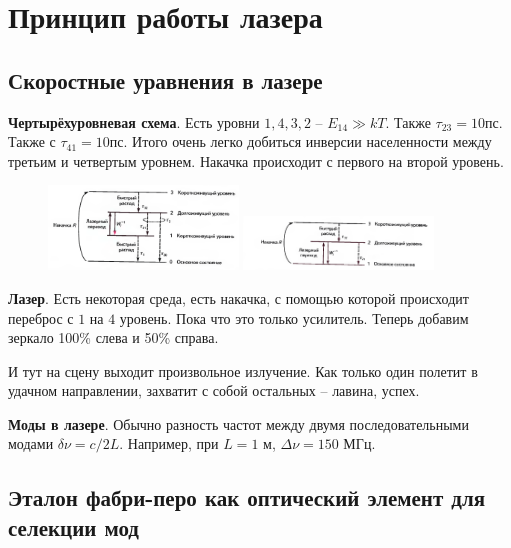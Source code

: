 \section{Принцип работы лазера}



\subsection{Скоростные уравнения в лазере}



\textbf{Чертырёхуровневая схема}.
Есть уровни $1,4,3,2$ -- $E_{14} \gg k T$. Также $\tau_{23} = 10$пс. Также с $\tau_{41} = 10$пс. Итого очень легко добиться инверсии населенности между третьим и четвертым уровнем. Накачка происходит с первого на второй уровень. 




\begin{figure}[hb]
    \centering
    \includegraphics[width=0.45\textwidth]{figures/012.png}
    \includegraphics[width=0.45\textwidth]{figures/013.png}
\end{figure}



\textbf{Лазер}.
Есть некоторая среда, есть накачка, с помощью которой происходит переброс с $1$ на $4$ уровень. Пока что это только усилитель. Теперь добавим зеркало 100\% слева и 50\% справа. 

И тут на сцену выходит произвольное излучение. Как только один полетит в удачном направлении, захватит с собой остальных -- лавина, успех. 



\textbf{Моды в лазере}.
Обычно разность частот между двумя последовательными модами $\delta \nu = c/2L$. Например, при $L=1$ м, $\Delta \nu = 150$ МГц. 






\subsection{Эталон фабри-перо как оптический элемент для селекции мод}



